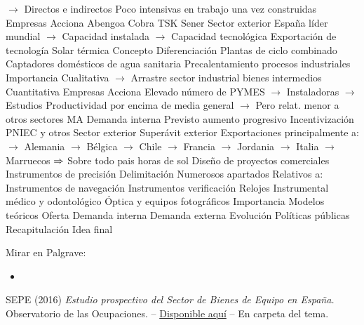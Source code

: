 \documentclass{nuevotema}
\begin{document}
\begin{esquemal}
				\4[] $\to$ Directos e indirectos
				\4[] Poco intensivas en trabajo una vez construidas
				\4 Empresas
				\4[] Acciona
				\4[] Abengoa
				\4[] Cobra
				\4[] TSK
				\4[] Sener
				\4 Sector exterior
				\4[] España líder mundial
				\4[] $\to$ Capacidad instalada
				\4[] $\to$ Capacidad tecnológica
				\4[] Exportación de tecnología
			\3 Solar térmica
				\4 Concepto
				\4 Diferenciación
				\4[] Plantas de ciclo combinado
				\4[] Captadores domésticos de agua sanitaria
				\4[] Precalentamiento procesos industriales
				\4 Importancia
				\4[] Cualitativa
				\4[] $\to$ Arrastre sector industrial bienes intermedios
				\4[] Cuantitativa
				\4 Empresas
				\4[] Acciona
				\4[] Elevado número de PYMES
				\4[] $\to$ Instaladoras
				\4[] $\to$ Estudios
				\4[] Productividad por encima de media general
				\4[] $\to$ Pero relat. menor a otros sectores MA
				\4 Demanda interna
				\4[] Previsto aumento progresivo
				\4[] Incentivización PNIEC y otros
				\4 Sector exterior
				\4[] Superávit exterior
				\4[] Exportaciones principalmente a:
				\4[] $\to$ Alemania
				\4[] $\to$ Bélgica
				\4[] $\to$ Chile
				\4[] $\to$ Francia
				\4[] $\to$ Jordania
				\4[] $\to$ Italia
				\4[] $\to$ Marruecos
				\4[] $\Rightarrow$ Sobre todo pais horas de sol
				\4[] Diseño de proyectos comerciales
		\2 Instrumentos de precisión
			\3 Delimitación
				\4 Numerosos apartados
				\4 Relativos a:
				\4[] Instrumentos de navegación
				\4[] Instrumentos verificación
				\4[] Relojes
				\4[] Instrumental médico y odontológico
				\4[] Óptica y equipos fotográficos
			\3 Importancia
			\3 Modelos teóricos
			\3 Oferta
			\3 Demanda interna
			\3 Demanda externa
			\3 Evolución
			\3 Políticas públicas
	\1[] 
		\2 Recapitulación
		\2 Idea final
\end{esquemal}


\graficas

\conceptos

\preguntas

\notas

\bibliografia

Mirar en Palgrave:
\begin{itemize}
	\item 
\end{itemize}

SEPE (2016) \textit{Estudio prospectivo del Sector de Bienes de Equipo en España.} Observatorio de las Ocupaciones. -- \href{https://www.sepe.es/contenidos/observatorio/mercado_trabajo/2731-2.pdf}{Disponible aquí} -- En carpeta del tema.
\end{document}
